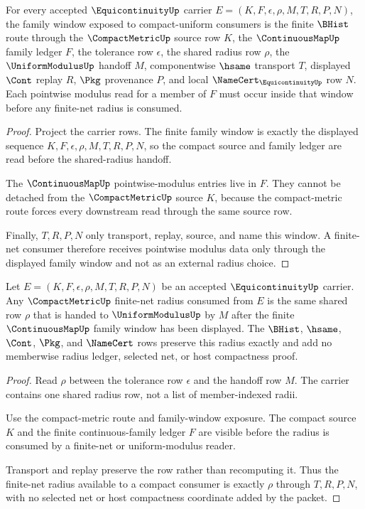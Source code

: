 \begin{theorem}
\label{thm:equicontinuity-family-window-exposure}
For every accepted $\EquicontinuityUp$ carrier $E=(K,F,\epsilon,\rho,M,T,R,P,N)$, the family window exposed to compact-uniform consumers is the finite $\BHist$ route through the $\CompactMetricUp$ source row $K$, the $\ContinuousMapUp$ family ledger $F$, the tolerance row $\epsilon$, the shared radius row $\rho$, the $\UniformModulusUp$ handoff $M$, componentwise $\hsame$ transport $T$, displayed $\Cont$ replay $R$, $\Pkg$ provenance $P$, and local $\NameCert_{\EquicontinuityUp}$ row $N$. Each pointwise modulus read for a member of $F$ must occur inside that window before any finite-net radius is consumed.
\end{theorem}
\begin{proof}
Project the carrier rows. The finite family window is exactly the displayed sequence $K,F,\epsilon,\rho,M,T,R,P,N$, so the compact source and family ledger are read before the shared-radius handoff.

The $\ContinuousMapUp$ pointwise-modulus entries live in $F$. They cannot be detached from the $\CompactMetricUp$ source $K$, because the compact-metric route forces every downstream read through the same source row.

Finally, $T,R,P,N$ only transport, replay, source, and name this window. A finite-net consumer therefore receives pointwise modulus data only through the displayed family window and not as an external radius choice.
\end{proof}

\begin{theorem}
\label{thm:equicontinuity-compact-net-radius-exactness}
Let $E=(K,F,\epsilon,\rho,M,T,R,P,N)$ be an accepted $\EquicontinuityUp$ carrier. Any $\CompactMetricUp$ finite-net radius consumed from $E$ is the same shared row $\rho$ that is handed to $\UniformModulusUp$ by $M$ after the finite $\ContinuousMapUp$ family window has been displayed. The $\BHist$, $\hsame$, $\Cont$, $\Pkg$, and $\NameCert$ rows preserve this radius exactly and add no memberwise radius ledger, selected net, or host compactness proof.
\end{theorem}
\begin{proof}
Read $\rho$ between the tolerance row $\epsilon$ and the handoff row $M$. The carrier contains one shared radius row, not a list of member-indexed radii.

Use the compact-metric route and family-window exposure. The compact source $K$ and the finite continuous-family ledger $F$ are visible before the radius is consumed by a finite-net or uniform-modulus reader.

Transport and replay preserve the row rather than recomputing it. Thus the finite-net radius available to a compact consumer is exactly $\rho$ through $T,R,P,N$, with no selected net or host compactness coordinate added by the packet.
\end{proof}


